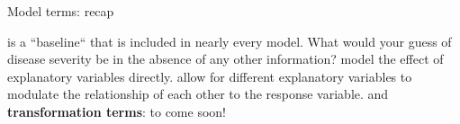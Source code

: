 \documentclass[table]{beamer}\usepackage[]{graphicx}\usepackage[]{color}
\begin{document}

\begin{frame}[fragile]{Model terms: recap}

\bi
   is a ``baseline`` that is included in nearly every model. What would your guess of disease severity be in the absence of any other information?
   model the effect of explanatory variables directly.
   allow for different explanatory variables to modulate the relationship of each other to the response variable.
   and {\bf transformation terms}: to come soon!
\ei

\end{frame}
\end{document}
